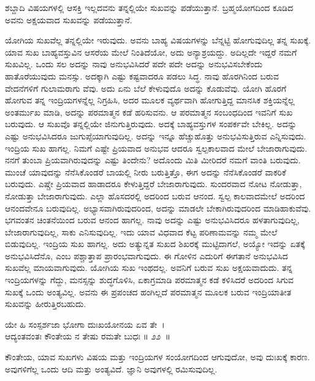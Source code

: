 \begin{artha}
ಶಬ್ದಾದಿ ವಿಷಯಗಳಲ್ಲಿ ಆಸಕ್ತಿ ಇಲ್ಲದವನು ತನ್ನಲ್ಲಿಯೇ ಸುಖವನ್ನು ಪಡೆಯುತ್ತಾನೆ. ಬ್ರಹ್ಮಯೋಗದಿಂದ ಕೂಡಿದ ಅವನು ಅಕ್ಷಯವಾದ ಸುಖವನ್ನು ಪಡೆಯುತ್ತಾನೆ.
\end{artha}

ಯೋಗಿಯ ಸುಖವೆಲ್ಲ ತನ್ನಲ್ಲಿಯೇ ಇರುವುದು. ಅವನು ಬಾಹ್ಯ ವಿಷಯಗಳನ್ನು ಬೆನ್ನಟ್ಟಿ ಹೋಗುವುದಿಲ್ಲ ತನ್ನ ಸುಖಕ್ಕೆ. ಯಾವ ಸುಖ ಬಾಹ್ಯವಸ್ತುವಿನ ಆಸರೆಯ ಮೇಲೆ ನಿಂತಿದೆಯೋ, ಅದು ಅನ್ಯಾಶ್ರಯದ್ದು. ಅದಿಲ್ಲದೇ ಇದ್ದರೆ ನಮಗೆ ಸುಖವಿಲ್ಲ. ಒಂದು ಸಲ ಅದನ್ನು ನಾವು ಅನುಭವಿಸಿದರೆ ಪದೇ ಪದೇ ಅದನ್ನು ಅನುಭವಿಸಬೇಕೆಂದು ಹಾತೊರೆಯುವುದು ಮನಸ್ಸು. ಅದಕ್ಕಾಗಿ ಎಷ್ಟು ಕಷ್ಟವಾದರೂ ಪಡಲು ಸಿದ್ಧ. ನಾವು ಹೊರಗಿನಿಂದ ಬರುವ ವೇದನೆಗಳಿಗೆ ಗುಲಾಮರಾಗು ವೆವು. ಅದು ಏನು ಬೆಲೆ ಕೇಳುವುದೊ ಅದನ್ನು ಕೊಡುವೆವು. ಯೋಗಿ ಹೊರಗೆ ಹೋಗುವ ತನ್ನ ಇಂದ್ರಿಯಗಳನ್ನೆಲ್ಲ ನಿಗ್ರಹಿಸಿ, ಅದರ ಮೂಲಕ ವ್ಯರ್ಥವಾಗಿ ಹೋಗುತ್ತಿದ್ದ ಮಾನಸಿಕ ಶಕ್ತಿಯನ್ನೆಲ್ಲ ಅಂತರ್ಮುಖ ಮಾಡಿ, ಅದನ್ನು ಪರಮಾತ್ಮನ ಕಡೆ ಹರಿಸುವನು. ಆ ಪರಮಾತ್ಮನ ಸಂಬಂಧದಿಂದ ಇವನಿಗೆ ಸುಖ ಬರುವುದು. ಆ ಸುಖವೊ ತನ್ನಲ್ಲಿಯೇ ಜಿನುಗುತ್ತಿರುವುದು. ಅದಕ್ಕೆ ಬಾಹ್ಯವಸ್ತುಗಳ ಸಂಪರ್ಕವೇ ಬೇಕಿಲ್ಲ. ಅದನ್ನು ಎಷ್ಟು ಅನುಭವಿಸಿದರೂ ಜುಗುಪ್ಸೆಯಾಗುವುದಿಲ್ಲ. ಅದನ್ನು ಇನ್ನೂ ಹೆಚ್ಚುಹೊತ್ತು ಅನುಭವಿಸುತ್ತಿರುವ ಎನ್ನಿಸುವುದು. ಇಂದ್ರಿಯ ಸುಖ ಹಾಗಲ್ಲ. ನಿಮಗೆ ಎಷ್ಟೇ ಪ್ರಿಯವಾದ ಅನುಭವ ಆದರೂ ಸ್ವಲ್ಪಕಾಲವಾದ ಮೇಲೆ ಬೇಜಾರಾಗುವುದು. ನನಗೆ ತುಂಬಾ ಪ್ರಿಯವಾಗಿರುವುದನ್ನು ಎಷ್ಟು ತಿಂದೇನು? ಅದೊಂದು ಮಿತಿ ಮೀರಿದರೆ ನಮಗೆ ವಾಂತಿ ಬರುವುದು. ಮುಂಚೆ ಯಾವುದನ್ನು ನೆನೆಸಿಕೊಂಡರೆ ಬಾಯಲ್ಲಿ ನೀರು ಬರುತ್ತಿತ್ತೊ, ಈಗ ಅದನ್ನು ನೆನೆಸಿಕೊಂಡರೆ ವಾಕರಿಕೆ ಬರುವುದು. ಎಷ್ಚೇ ಪ್ರಿಯವಾದ ಹಾಡಾದರೂ ಕೇಳುತ್ತಿದ್ದರೆ ಬೇಜಾರಾಗುವುದು. ಸುಂದರವಾದ ನೋಟ ನೋಡುತ್ತಾ, ನೋಡುತ್ತಾ ಬೇಜಾರಾಗುವುದು. ಎಲ್ಲಾ ಹೊಸದರಲ್ಲಿ ಅದರಿಂದ ಬರುವ ಆನಂದ. ಸ್ವಲ್ಪ ಕಾಲವಾದಮೇಲೆ ಅದರಿಂದ ಆನಂದವೇನೂ ಬರುವುದಿಲ್ಲ. ಅಭ್ಯಾಸವಾಗಿರುವುದರಿಂದ, ಅದನ್ನು ಮಾಡಲೇ ಬೇಕಾಗಿರುವುದರಿಂದ ಮಾಡಿಹಾಕುವೆವು. ಭಗವಂತನ ಚಿಂತನೆಯಿಂದ ಬರುವ ಆನಂದ ಹಾಗಲ್ಲ. ನಾವು ಅದನ್ನು ಎಷ್ಟು ಅನುಭವಿಸಿದರೂ ಹಳತಾಗುವುದಿಲ್ಲ, ಬೇಜಾರಾಗುವುದಿಲ್ಲ, ಸಾಕು ಎನಿಸುವುದಿಲ್ಲ. ಇದು ಯಾವ ವಿಧವಾದ ಕೆಟ್ಟ ಪರಿಣಾಮವನ್ನು ನಮ್ಮ ಮೇಲೆ ಬಿಡುವುದಿಲ್ಲ. ಇಂದ್ರಿಯ ಸುಖ ಹಾಗಲ್ಲ. ಅದು ಅತ್ಯುನ್ನತ ಸುಖದ ಶಿಖರಕ್ಕೆ ಮುಟ್ಟಿದಾಗಲೆ, ಅಯ್ಯೋ ಇದನ್ನು ಏತಕ್ಕೆ ಅನುಭವಿಸಿದೆನೊ, ಎಂಬ ಪಶ್ಚಾತ್ತಾಪ ಪ್ರಾರಂಭವಾಗುವುದು. ಈ ಗೋಳಿನ ಎದುರಿಗೆ ಈಗತಾನೆ ಅನುಭವಿಸಿದ ಸುಖವೆಲ್ಲ ಮಾಯವಾಗುವುದು. ಯೋಗಿಯ ಸುಖ ಇಂಥದಲ್ಲ. ಅವನಿಗೆ ಬರುವ ಸುಖ ಅಕ್ಷಯವಾದುದು. ತನ್ನ ಇಂದ್ರಿಯಗಳನ್ನು ಗೆದ್ದು, ಮನಸ್ಸನ್ನು ಶುದ್ಧಗೊಳಿಸಿ, ಏಕಾಗ್ರಮಾಡಿ ಪರಮಾತ್ಮನ ಕಡೆ ಕಳಿಸಿದರೆ ಅದರಿಂದ ಸಿಗುವ ಸುಖಕ್ಕೆ ಒಂದು ಅಂತ್ಯವಿಲ್ಲ. ಅವನು ಈ ಪ್ರಪಂಚದ ಹಂಗಿಲ್ಲದೆ ಪರಮಾತ್ಮನ ಮೂಲಕ ಬರುವ ಇಂದ್ರಿಯಾತೀತ ಸುಖವನ್ನು ಹೀರುತ್ತಿರಬಹುದು.

\begin{shloka}
ಯೇ ಹಿ ಸಂಸ್ಪರ್ಶಜಾ ಭೋಗಾ ದುಃಖಯೋನಯ ಏವ ತೇ~।\\ಆದ್ಯಂತವಂತಃ ಕೌಂತೇಯ ನ ತೇಷು ರಮತೇ ಬುಧಃ \hfill॥ ೨೨~॥
\end{shloka}

\begin{artha}
ಕೌಂತೇಯ, ಯಾವ ಸುಖಗಳು ವಿಷಯ ಮತ್ತು ಇಂದ್ರಿಯಗಳ ಸಂಯೋಗದಿಂದ ಆಗುವುದೋ, ಅವು ದುಃಖಕ್ಕೆ ಕಾರಣ. ಅವುಗಳಿಗೆಲ್ಲ ಒಂದು ಆದಿ ಮತ್ತು ಅಂತ್ಯವಿದೆ. ಜ್ಞಾನಿ ಅವುಗಳಲ್ಲಿ ರಮಿಸುವುದಿಲ್ಲ.
\end{artha}

